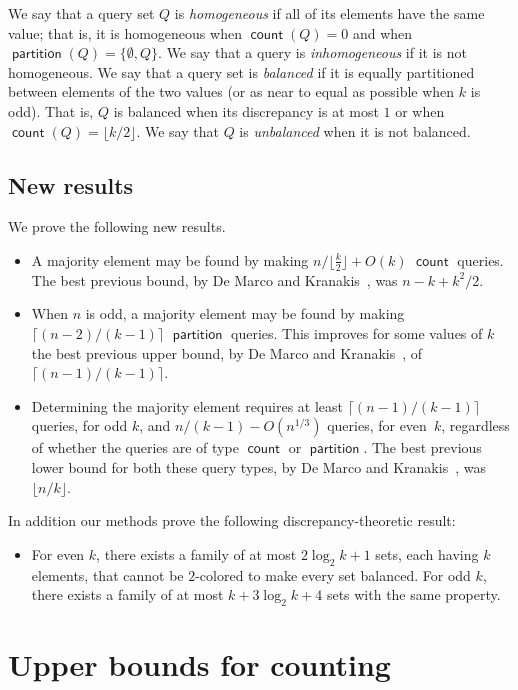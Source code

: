 \documentclass[11pt]{llncs}
\newcommand{\qcount}{\operatorname{\mathsf{count}}}
\newcommand{\qpart}{\operatorname{\mathsf{partition}}}
\begin{document}
We say that a query set $Q$ is \emph{homogeneous} if all of its elements have the same value; that is, it is homogeneous when $\qcount(Q)=0$ and when $\qpart(Q)=\{\emptyset,Q\}$. We say that a query is \emph{inhomogeneous} if it is not homogeneous. We say that a query set is \emph{balanced} if it is equally partitioned between elements of the two values (or as near to equal as possible when $k$ is odd). That is, $Q$ is balanced when its discrepancy is at most $1$ or when $\qcount(Q)=\lfloor k/2\rfloor$. We say that $Q$ is \emph{unbalanced} when it is not balanced.

\subsection{New results}

We prove the following new results.
\begin{itemize}
\item A majority element may be found by making $n/\lfloor\tfrac{k}{2}\rfloor+O(k)$ $\qcount$ queries. The best previous bound, by De Marco and Kranakis~\cite{DeMKra-DMAA-15}, was $n-k+k^2/2$.
\item When $n$ is odd, a majority element may be found by making $\lceil (n-2)/(k-1)\rceil$ $\qpart$ queries. This improves for some values of $k$ the best previous upper bound, by De Marco and Kranakis~\cite{DeMKra-DMAA-15}, of $\lceil (n-1)/(k-1)\rceil$.
\item Determining the majority element requires at least $\lceil (n-1)/(k-1)\rceil$ queries, for odd $k$, and $n/(k-1)-O(n^{1/3})$ queries, for even~$k$, regardless of whether the queries are of type $\qcount$ or $\qpart$. The best previous lower bound for both these query types, by De Marco and Kranakis~\cite{DeMKra-DMAA-15}, was $\lfloor n/k\rfloor$.
\end{itemize}
In addition our methods prove the following discrepancy-theoretic result:
\begin{itemize}
\item For even $k$, there exists a family of at most $2\log_2 k+1$ sets, each having $k$ elements, that cannot be $2$-colored to make every set balanced. For odd $k$, there exists a family of at most $k+3\log_2 k+4$ sets with the same property.
\end{itemize}

\section{Upper bounds for counting}
\end{document}
